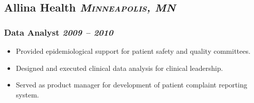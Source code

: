 \documentclass[11pt]{article}
\newcommand{\rside}[1]{
  \hfill {\itshape #1}%
}
\begin{document}
\subsection{Allina Health \rside{\normalfont\large\bfseries\scshape{Minneapolis, MN}}}
\subsubsection{Data Analyst\rside{2009 -- 2010}}
\begin{itemize}[label=-]
    \item Provided epidemiological support for patient safety and quality committees.
    \item Designed and executed clinical data analysis for clinical leadership.
    \item Served as product manager for development of patient complaint reporting system.
\end{itemize}
\end{document}
